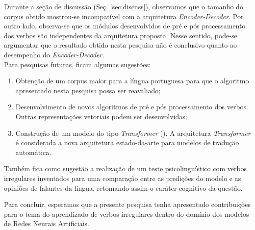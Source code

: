 Durante a seção de discussão (Seç. \ref{sec:discuss}), observamos que o tamanho do corpus obtido mostrou-se incompatível com a arquitetura \textit{Encoder-Decoder}. Por outro lado, observa-se que os módulos desenvolvidos de pré e pós processamento dos verbos são independentes da arquitetura proposta. Nesse sentido, pode-se argumentar que o resultado obtido nesta pesquisa não é conclusivo quanto ao desempenho do \textit{Encoder-Decoder}. \\

Para pesquisas futuras, ficam algumas sugestões:

\begin{enumerate}

\item Obtenção de um corpus maior para a língua portuguesa
para que o algoritmo apresentado nesta pesquisa possa ser reavaliado;

\item Desenvolvimento de novos algoritmos de pré e pós processamento dos verbos. Outras representações vetoriais%
 podem ser desenvolvidas; 

\item Construção de um modelo do tipo \textit{Transformer} (\cite{Vaswani2017AttentionIA}). A arquitetura \textit{Transformer} é considerada a nova arquitetura estado-da-arte para modelos de tradução automática. 

\end{enumerate}

Também fica como sugestão a realização de um teste psicolinguístico com verbos irregulares inventados para uma comparação entre as predições do modelo e as opiniões de falantes da língua, retomando assim o caráter cognitivo da questão. 

Para concluir, esperamos que a presente pesquisa tenha apresentado contribuições para o tema do aprendizado de verbos irregulares dentro do domínio dos modelos de Redes Neurais Artificiais. 